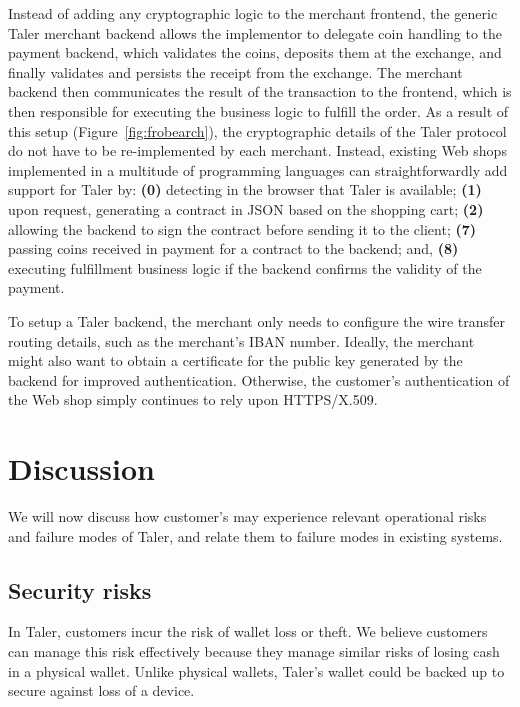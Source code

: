\documentclass{llncs}
\begin{document}
Instead of adding any cryptographic logic to the merchant frontend,
the generic Taler merchant backend allows the implementor to delegate
coin handling to the payment backend, which validates the coins,
deposits them at the exchange, and finally validates and persists the
receipt from the exchange.  The merchant backend then communicates the
result of the transaction to the front\-end, which is then responsible
for executing the business logic to fulfill the order.  As a result of
this setup (Figure~\ref{fig:frobearch}), the cryptographic details
of the Taler protocol do not have to be re-implemented by each
merchant.  Instead, existing Web shops implemented in a multitude of
programming languages can straightforwardly add support for Taler by:
{\bf (0)} detecting in the browser that Taler is available; {\bf (1)}
upon request, generating a contract in JSON based on the shopping
cart; {\bf (2)} allowing the backend to sign the contract before
sending it to the client; {\bf (7)} passing coins received in payment
for a contract to the backend; and, {\bf (8)} executing fulfillment
business logic if the backend confirms the validity of the payment.

To setup a Taler backend, the merchant only needs to configure the
wire transfer routing details, such as the merchant's IBAN number.
Ideally, the merchant might also want to obtain a certificate for the
public key generated by the backend for improved authentication.
Otherwise, the customer's authentication of the Web shop simply
continues to rely upon HTTPS/X.509.


\section{Discussion}

We will now discuss how customer's may experience relevant operational
risks and failure modes of Taler, and relate them to failure modes
in existing systems.

\subsection{Security risks}

In Taler, customers incur the risk of wallet loss or theft.  We
believe customers can manage this risk effectively because they manage
similar risks of losing cash in a physical wallet.  Unlike physical
wallets, Taler's wallet could be backed up to secure against loss of a
device.
\end{document}
